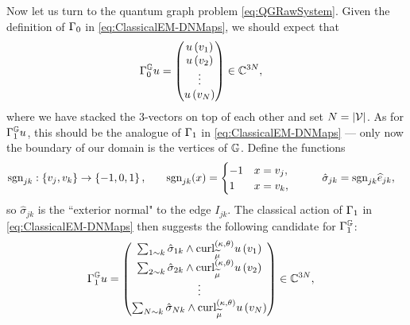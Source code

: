 Now let us turn to the quantum graph problem \eqref{eq:QGRawSystem}.
Given the definition of $\Gamma_0$ in \eqref{eq:ClassicalEM-DNMaps}, we should expect that
\begin{align} \label{eq:DGMapDef}
	\Gamma_0^{\mathbb{G}} u &= 
	\begin{pmatrix}
		u\left( v_1 \right) \\ u\left( v_2 \right) \\ \vdots \\ u\left( v_N \right)
	\end{pmatrix}
	\in\mathbb{C}^{3N},
\end{align}
where we have stacked the 3-vectors on top of each other and set $N=\left\lvert \mathcal{V} \right\rvert$.
As for $\Gamma_1^{\mathbb{G}} u$, this should be the analogue of $\Gamma_1$ in \eqref{eq:ClassicalEM-DNMaps} --- only now the boundary of our domain is the vertices of $\mathbb{G}$.
Define the functions 
\begin{align*}
	\mathrm{sgn}_{jk}: \left\{ v_j, v_k \right\} \rightarrow \left\{ -1,0,1 \right\}, 
	&\qquad
	\mathrm{sgn}_{jk}(x) = \begin{cases} -1 & x=v_j, \\ 1 & x=v_k, \end{cases}
	&\qquad
	\hat{\sigma}_{jk} &= \mathrm{sgn}_{jk}\widehat{e}_{jk},
\end{align*}
so $\hat{\sigma}_{jk}$ is the ``exterior normal" to the edge $I_{jk}$.
The classical action of $\Gamma_1$ in \eqref{eq:ClassicalEM-DNMaps} then suggests the following candidate for $\Gamma_1^{\mathbb{G}}$:
\begin{align} \label{eq:NGMapDef}
	\Gamma_1^{\mathbb{G}} u &= 
	\begin{pmatrix}
		\sum_{1\sim k} \hat{\sigma}_{1k}\wedge\mathrm{curl}_{\widetilde{\mu}}^{\left( \kappa, \theta \right)}u\left( v_1 \right) \\
		\sum_{2\sim k} \hat{\sigma}_{2k}\wedge\mathrm{curl}_{\widetilde{\mu}}^{\left( \kappa, \theta \right)}u\left( v_2 \right) \\
		\vdots \\
		\sum_{N\sim k} \hat{\sigma}_{Nk}\wedge\mathrm{curl}_{\widetilde{\mu}}^{\left( \kappa, \theta \right)}u\left( v_N \right)
	\end{pmatrix}
	\in\mathbb{C}^{3N},
\end{align}
